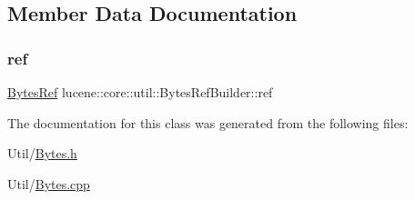 \subsection{Member Data Documentation}
\mbox{\label{classlucene_1_1core_1_1util_1_1BytesRefBuilder_ad6f2fc3362182886584f9c3a5fcb9a56}} 
\subsubsection{\texorpdfstring{ref}{ref}}
{\footnotesize\ttfamily \mbox{\hyperlink{classlucene_1_1core_1_1util_1_1BytesRef}{Bytes\+Ref}} lucene\+::core\+::util\+::\+Bytes\+Ref\+Builder\+::ref\hspace{0.3cm}{\ttfamily [private]}}



The documentation for this class was generated from the following files\+:\begin{DoxyCompactItemize}
\item 
Util/\mbox{\hyperlink{Bytes_8h}{Bytes.\+h}}\item 
Util/\mbox{\hyperlink{Bytes_8cpp}{Bytes.\+cpp}}\end{DoxyCompactItemize}
